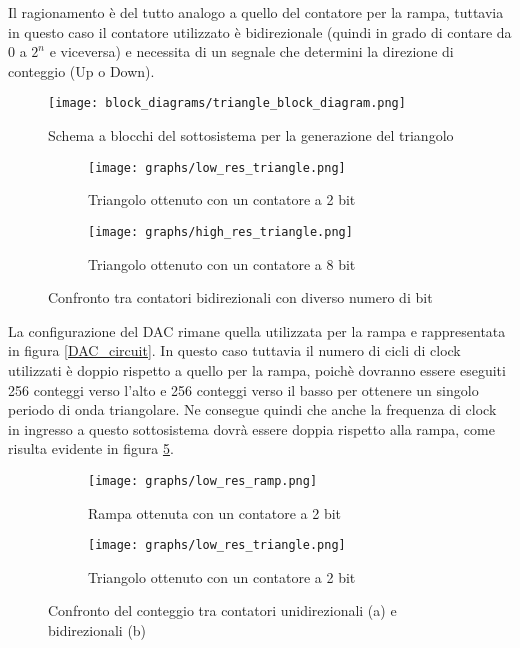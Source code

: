 
Il ragionamento è del tutto analogo a quello del contatore per la rampa, tuttavia in questo
caso il contatore utilizzato è bidirezionale (quindi in grado di contare da $0$ a $2^n$ e
viceversa) e necessita di un segnale che determini la direzione di conteggio (Up o Down).

\begin{figure}[H]
    \centering
    \texttt{[image: block\_diagrams/triangle\_block\_diagram.png]}
    \caption{Schema a blocchi del sottosistema per la generazione del triangolo}
    \label{triangle_block_diagram}
\end{figure}

\begin{figure}[H]
    \centering

    \begin{subfigure}{.5\textwidth}
        \centering
        \texttt{[image: graphs/low\_res\_triangle.png]}
        \caption{Triangolo ottenuto con un contatore a 2 bit}
        \label{low_res_triangle}
    \end{subfigure}%
    \begin{subfigure}{.5\textwidth}
        \centering
        \texttt{[image: graphs/high\_res\_triangle.png]}
        \caption{Triangolo ottenuto con un contatore a 8 bit}
        \label{high_res_triangle}
    \end{subfigure}

    \caption{Confronto tra contatori bidirezionali con diverso numero di bit}
    \label{triangles}
\end{figure}

La configurazione del DAC rimane quella utilizzata per la rampa e rappresentata in figura
\ref{DAC_circuit}. In questo caso tuttavia il numero di cicli di clock utilizzati è doppio
rispetto a quello per la rampa, poichè dovranno essere eseguiti 256 conteggi verso l'alto
e 256 conteggi verso il basso per ottenere un singolo periodo di onda triangolare. Ne
consegue quindi che anche la frequenza di clock in ingresso a questo sottosistema dovrà
essere doppia rispetto alla rampa, come risulta evidente in figura \ref{steps}.

\begin{figure}[H]
    \centering

    \begin{subfigure}{.5\textwidth}
        \centering
        \texttt{[image: graphs/low\_res\_ramp.png]}
        \caption{Rampa ottenuta con un contatore a 2 bit}
    \end{subfigure}%
    \begin{subfigure}{.5\textwidth}
        \centering
        \texttt{[image: graphs/low\_res\_triangle.png]}
        \caption{Triangolo ottenuto con un contatore a 2 bit}
    \end{subfigure}

    \caption{Confronto del conteggio tra contatori unidirezionali (a) e bidirezionali (b)}
    \label{steps}
\end{figure}

